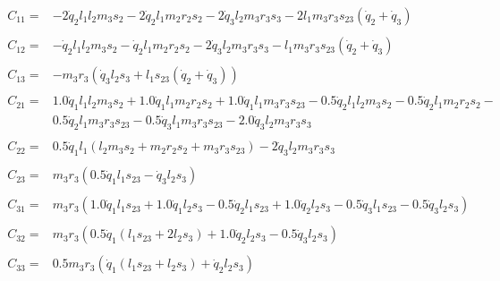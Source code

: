 \begin{align}
    \begin{split}
        C_{11} =& - 2 \dot{q}_2 l_{1} l_{2} m_{3} s_{2} - 2 \dot{q}_2 l_{1} m_{2} r_{2} s_{2} - 2 \dot{q}_3 l_{2} m_{3} r_{3} s_{3} - 2 l_{1} m_{3} r_{3} s_{23} \left(\dot{q}_2 + \dot{q}_3\right)
    \end{split} \nonumber \\
    \begin{split}
        C_{12} =& - \dot{q}_2 l_{1} l_{2} m_{3} s_{2} - \dot{q}_2 l_{1} m_{2} r_{2} s_{2} - 2 \dot{q}_3 l_{2} m_{3} r_{3} s_{3} - l_{1} m_{3} r_{3} s_{23} \left(\dot{q}_2 + \dot{q}_3\right)
    \end{split} \nonumber \\
    \begin{split}
        C_{13} =& - m_{3} r_{3} \left(\dot{q}_3 l_{2} s_{3} + l_{1} s_{23} \left(\dot{q}_2 + \dot{q}_3\right)\right)
    \end{split}
    \label{eq:3r-dyn-cc-matrix-col1}
    \\
    \begin{split}
        C_{21} =& 1.0 \dot{q}_1 l_{1} l_{2} m_{3} s_{2} + 1.0 \dot{q}_1 l_{1} m_{2} r_{2} s_{2} + 1.0 \dot{q}_1 l_{1} m_{3} r_{3} s_{23} - 0.5 \dot{q}_2 l_{1} l_{2} m_{3} s_{2} - 0.5 \dot{q}_2 l_{1} m_{2} r_{2} s_{2} - \\
            & 0.5 \dot{q}_2 l_{1} m_{3} r_{3} s_{23} - 0.5 \dot{q}_3 l_{1} m_{3} r_{3} s_{23} - 2.0 \dot{q}_3 l_{2} m_{3} r_{3} s_{3}
    \end{split} \nonumber \\
    \begin{split}
        C_{22} =& 0.5 \dot{q}_1 l_{1} \left(l_{2} m_{3} s_{2} + m_{2} r_{2} s_{2} + m_{3} r_{3} s_{23}\right) - 2 \dot{q}_3 l_{2} m_{3} r_{3} s_{3}
    \end{split} \nonumber \\
    \begin{split}
        C_{23} =& m_{3} r_{3} \left(0.5 \dot{q}_1 l_{1} s_{23} - \dot{q}_3 l_{2} s_{3}\right)
    \end{split}
    \label{eq:3r-dyn-cc-matrix-col2}
    \\
    \begin{split}
        C_{31} =& m_{3} r_{3} \left(1.0 \dot{q}_1 l_{1} s_{23} + 1.0 \dot{q}_1 l_{2} s_{3} - 0.5 \dot{q}_2 l_{1} s_{23} + 1.0 \dot{q}_2 l_{2} s_{3} - 0.5 \dot{q}_3 l_{1} s_{23} - 0.5 \dot{q}_3 l_{2} s_{3}\right)
    \end{split} \nonumber \\
    \begin{split}
        C_{32} =& m_{3} r_{3} \left(0.5 \dot{q}_1 \left(l_{1} s_{23} + 2 l_{2} s_{3}\right) + 1.0 \dot{q}_2 l_{2} s_{3} - 0.5 \dot{q}_3 l_{2} s_{3}\right)
    \end{split} \nonumber \\
    \begin{split}
        C_{33} =& 0.5 m_{3} r_{3} \left(\dot{q}_1 \left(l_{1} s_{23} + l_{2} s_{3}\right) + \dot{q}_2 l_{2} s_{3}\right)
    \end{split}
    \label{eq:3r-dyn-cc-matrix-col3}
\end{align}

